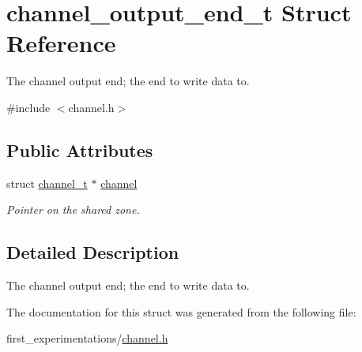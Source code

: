 \hypertarget{structchannel__output__end__t}{\section{channel\-\_\-output\-\_\-end\-\_\-t Struct Reference}
\label{structchannel__output__end__t}
}


The channel output end; the end to write data to.  




{\ttfamily \#include $<$channel.\-h$>$}

\subsection*{Public Attributes}
\begin{DoxyCompactItemize}
\item 
\hypertarget{structchannel__output__end__t_aa4cc28a9fefc5813f797c362ac00facd}{struct \hyperlink{structchannel__t}{channel\-\_\-t} $\ast$ \hyperlink{structchannel__output__end__t_aa4cc28a9fefc5813f797c362ac00facd}{channel}}\label{structchannel__output__end__t_aa4cc28a9fefc5813f797c362ac00facd}

\begin{DoxyCompactList}\small\item\em Pointer on the shared zone. \end{DoxyCompactList}\end{DoxyCompactItemize}


\subsection{Detailed Description}
The channel output end; the end to write data to. 

The documentation for this struct was generated from the following file\-:\begin{DoxyCompactItemize}
\item 
first\-\_\-experimentations/\hyperlink{channel_8h}{channel.\-h}\end{DoxyCompactItemize}
